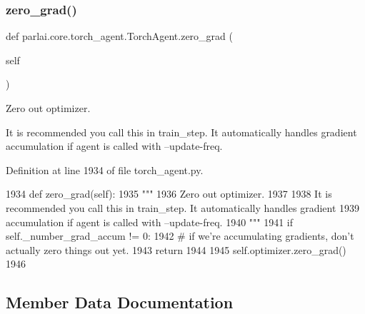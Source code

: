 \mbox{\label{classparlai_1_1core_1_1torch__agent_1_1TorchAgent_a91c163f3e2d39b380095b7083f673b6e}} 
\subsubsection{\texorpdfstring{zero\+\_\+grad()}{zero\_grad()}}
{\footnotesize\ttfamily def parlai.\+core.\+torch\+\_\+agent.\+Torch\+Agent.\+zero\+\_\+grad (\begin{DoxyParamCaption}\item[{}]{self }\end{DoxyParamCaption})}

\begin{DoxyVerb}Zero out optimizer.

It is recommended you call this in train_step. It automatically handles gradient
accumulation if agent is called with --update-freq.
\end{DoxyVerb}
 

Definition at line 1934 of file torch\+\_\+agent.\+py.


\begin{DoxyCode}
1934     \textcolor{keyword}{def }zero\_grad(self):
1935         \textcolor{stringliteral}{"""}
1936 \textcolor{stringliteral}{        Zero out optimizer.}
1937 \textcolor{stringliteral}{}
1938 \textcolor{stringliteral}{        It is recommended you call this in train\_step. It automatically handles gradient}
1939 \textcolor{stringliteral}{        accumulation if agent is called with --update-freq.}
1940 \textcolor{stringliteral}{        """}
1941         \textcolor{keywordflow}{if} self.\_number\_grad\_accum != 0:
1942             \textcolor{comment}{# if we're accumulating gradients, don't actually zero things out yet.}
1943             \textcolor{keywordflow}{return}
1944 
1945         self.optimizer.zero\_grad()
1946 
\end{DoxyCode}


\subsection{Member Data Documentation}
\mbox{\label{classparlai_1_1core_1_1torch__agent_1_1TorchAgent_a63011fa9bd927de8acc9ffa676caa73a}} 
